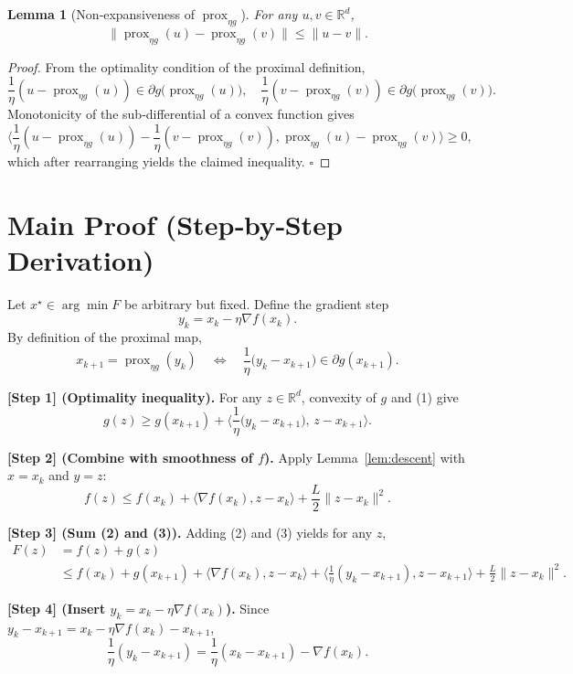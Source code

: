 \documentclass{article}
\newtheorem{lemma}{Lemma}
\begin{document}
\begin{lemma}[Non‑expansiveness of $\operatorname{prox}_{\eta g}$]\label{lem:prox}
For any $u,v\in\mathbb{R}^{d}$,
\[
\|\operatorname{prox}_{\eta g}(u)-\operatorname{prox}_{\eta g}(v)\|\le\|u-v\|.
\]
\end{lemma}
\begin{proof}
From the optimality condition of the proximal definition,
\[
\frac{1}{\eta}(u-\operatorname{prox}_{\eta g}(u))\in\partial g\bigl(\operatorname{prox}_{\eta g}(u)\bigr),
\quad
\frac{1}{\eta}(v-\operatorname{prox}_{\eta g}(v))\in\partial g\bigl(\operatorname{prox}_{\eta g}(v)\bigr).
\]
Monotonicity of the sub‑differential of a convex function gives
\[
\Big\langle\frac{1}{\eta}(u-\operatorname{prox}_{\eta g}(u))-
\frac{1}{\eta}(v-\operatorname{prox}_{\eta g}(v)),
\operatorname{prox}_{\eta g}(u)-\operatorname{prox}_{\eta g}(v)\Big\rangle\ge0,
\]
which after rearranging yields the claimed inequality. $\square$
\end{proof}

\section*{Main Proof (Step‑by‑Step Derivation)}
Let $x^{\star}\in\arg\min F$ be arbitrary but fixed.  Define the gradient step
\[
y_{k}=x_{k}-\eta\nabla f(x_{k}).
\]
By definition of the proximal map,
\[
x_{k+1}= \operatorname{prox}_{\eta g}(y_{k})\quad\Longleftrightarrow\quad
\frac{1}{\eta}\bigl(y_{k}-x_{k+1}\bigr)\in\partial g(x_{k+1}).
\tag{1}
\]

\noindent\textbf{[Step 1] (Optimality inequality).}  
For any $z\in\mathbb{R}^{d}$, convexity of $g$ and (1) give
\[
g(z)\ge g(x_{k+1})+\Big\langle\frac{1}{\eta}\bigl(y_{k}-x_{k+1}\bigr),\,z-x_{k+1}\Big\rangle.
\tag{2}
\]

\noindent\textbf{[Step 2] (Combine with smoothness of $f$).}  
Apply Lemma~\ref{lem:descent} with $x=x_{k}$ and $y=z$:
\[
f(z)\le f(x_{k})+\langle\nabla f(x_{k}),z-x_{k}\rangle+\frac{L}{2}\|z-x_{k}\|^{2}.
\tag{3}
\]

\noindent\textbf{[Step 3] (Sum (2) and (3)).}  
Adding (2) and (3) yields for any $z$,
\[
\begin{aligned}
F(z)&=f(z)+g(z)\\
&\le f(x_{k})+g(x_{k+1})
+\langle\nabla f(x_{k}),z-x_{k}\rangle
+\Big\langle\frac{1}{\eta}(y_{k}-x_{k+1}),z-x_{k+1}\Big\rangle
+\frac{L}{2}\|z-x_{k}\|^{2}.
\end{aligned}
\tag{4}
\]

\noindent\textbf{[Step 4] (Insert $y_{k}=x_{k}-\eta\nabla f(x_{k})$).}  
Since $y_{k}-x_{k+1}=x_{k}-\eta\nabla f(x_{k})-x_{k+1}$,
\[
\frac{1}{\eta}(y_{k}-x_{k+1})=
\frac{1}{\eta}(x_{k}-x_{k+1})-\nabla f(x_{k}).
\tag{5}
\]
\end{document}
